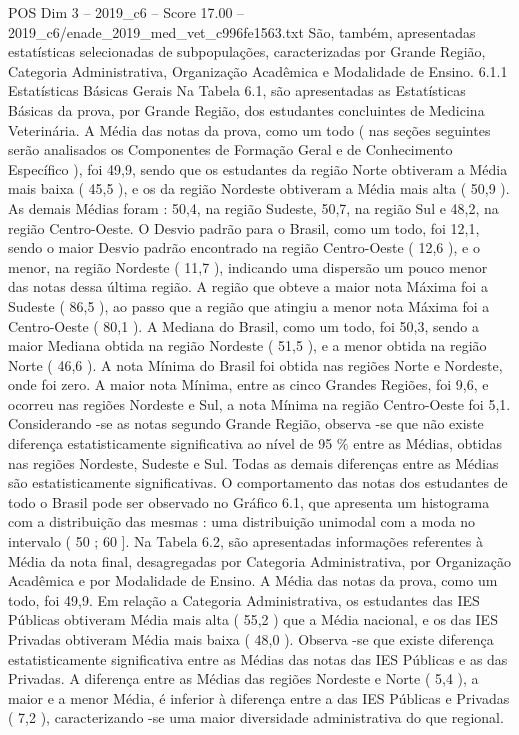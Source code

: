 \begin{textsample}{POS Dim 3 – 2019\_c6 – Score 17.00 – 2019\_c6/enade\_2019\_med\_vet\_c996fe1563.txt}
São, também, apresentadas estatísticas selecionadas de subpopulações, caracterizadas por Grande Região, Categoria Administrativa, Organização Acadêmica e Modalidade de Ensino. 6.1.1 Estatísticas Básicas Gerais Na Tabela 6.1, são apresentadas as Estatísticas Básicas da prova, por Grande Região, dos estudantes concluintes de Medicina Veterinária.
A Média das notas da prova, como um todo ( nas seções seguintes serão analisados os Componentes de Formação Geral e de Conhecimento Específico ), foi 49,9, sendo que os estudantes da região Norte obtiveram a Média mais baixa ( 45,5 ), e os da região Nordeste obtiveram a Média mais alta ( 50,9 ).
As demais Médias foram : 50,4, na região Sudeste, 50,7, na região Sul e 48,2, na região Centro-Oeste.
O Desvio padrão para o Brasil, como um todo, foi 12,1, sendo o maior Desvio padrão encontrado na região Centro-Oeste ( 12,6 ), e o menor, na região Nordeste ( 11,7 ), indicando uma dispersão um pouco menor das notas dessa última região.
A região que obteve a maior nota Máxima foi a Sudeste ( 86,5 ), ao passo que a região que atingiu a menor nota Máxima foi a Centro-Oeste ( 80,1 ).
A Mediana do Brasil, como um todo, foi 50,3, sendo a maior Mediana obtida na região Nordeste ( 51,5 ), e a menor obtida na região Norte ( 46,6 ).
A nota Mínima do Brasil foi obtida nas regiões Norte e Nordeste, onde foi zero.
A maior nota Mínima, entre as cinco Grandes Regiões, foi 9,6, e ocorreu nas regiões Nordeste e Sul, a nota Mínima na região Centro-Oeste foi 5,1.
Considerando -se as notas segundo Grande Região, observa -se que não existe diferença estatisticamente significativa ao nível de 95 \% entre as Médias, obtidas nas regiões Nordeste, Sudeste e Sul.
Todas as demais diferenças entre as Médias são estatisticamente significativas.
O comportamento das notas dos estudantes de todo o Brasil pode ser observado no Gráfico 6.1, que apresenta um histograma com a distribuição das mesmas : uma distribuição unimodal com a moda no intervalo ( 50 ; 60 ].
Na Tabela 6.2, são apresentadas informações referentes à Média da nota final, desagregadas por Categoria Administrativa, por Organização Acadêmica e por Modalidade de Ensino.
A Média das notas da prova, como um todo, foi 49,9.
Em relação a Categoria Administrativa, os estudantes das IES Públicas obtiveram Média mais alta ( 55,2 ) que a Média nacional, e os das IES Privadas obtiveram Média mais baixa ( 48,0 ).
Observa -se que existe diferença estatisticamente significativa entre as Médias das notas das IES Públicas e as das Privadas.
A diferença entre as Médias das regiões Nordeste e Norte ( 5,4 ), a maior e a menor Média, é inferior à diferença entre a das IES Públicas e Privadas ( 7,2 ), caracterizando -se uma maior diversidade administrativa do que regional.

\end{textsample}
